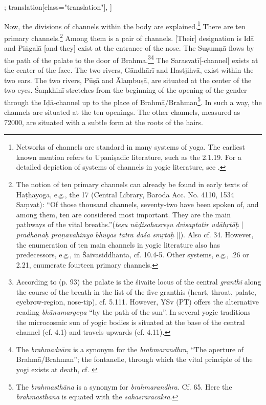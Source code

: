 \begin{alignment}[
  texts=edition[class="edition"];
  translation[class="translation"],
  ]
\begin{translation}
\begin{tlate}[p25_01]
 Now, the divisions of channels within the body are explained.\footnote{Networks of channels are standard in many systems of yoga. The earliest known mention refers to Upaniṣadic literature, such as the  2.1.19. For a detailed depiction of systems of channels in yogic literature, see \citeauthor[2017: 172-174, 184-198]{rootsofyoga2017}.} There are ten primary channels.\footnote{The notion of ten primary channels can already be found in early texts of Haṭhayoga, e.g., the  17 (Central Library, Baroda Acc. No. 4110, 1534 Saṃvat): ``Of those thousand channels, seventy-two have been spoken of, and among them, ten are considered most important. They are the main pathways of the vital breaths.''(\textit{teṣu nāḍisahasreṣu dvisaptatir udāhṛtāḥ} | \textit{pradhānāḥ prāṇavāhinyo bhūyas tatra daśa smṛtāḥ} ||). Also cf.  34. However, the enumeration of ten main channels in yogic literature also has predecessors, e.g., in Śaivasiddhānta, cf.  10.4-5. Other systems, e.g.,  .26 or  2.21, enumerate fourteen primary channels.} Among them is a pair of channels. [Their] designation is Idā and Piṅgalā [and they] exist at the entrance of the nose. The Suṣumṇā flows by the path of the palate to the door of Brahma.\footnote{According to  (p. 93) the palate is the śivaite locus of the central \textit{granthi} along the course of the breath in the list of the five granthis (heart, throat, palate, eyebrow-region, nose-tip), cf.  5.111. However, YSv (PT) offers the alternative reading \textit{bhānumargeṇa} ``by the path of the sun''. In several yogic traditions the microcosmic sun of yogic bodies is situated at the base of the central channel (cf.  4.1) and travels upwards (cf.  4.11).}\footnote{The \textit{brahmadvāra} is a synonym for the \textit{brahmarandhra}, ``The aperture of Brahmā/Brahman''; the fontanelle, through which the vital principle of the yogi exists at death, cf. \citeauthor[2017:438]{rootsofyoga2017}} The Sarasvatī[-channel] exists at the center of the face. The two rivers, Gāndhārī and Hastjihvā, exist within the two ears. The two rivers, Pūṣā and Ālaṃbuṣā, are situated at the center of the two eyes. Śaṃkhinī stretches from the beginning of the opening of the gender through the Iḍā-channel up to the place of Brahmā/Brahman\footnote{The \textit{brahmasthāna} is a synonym for \textit{brahmarandhra}. Cf.  65. Here the \textit{brahmasthāna} is equated with the \textit{sahasrāracakra}.}.  In such a way, the channels are situated at the ten openings. The other channels, measured as 72000, are situated with a subtle form at the roots of the hairs.

\end{tlate}
\end{translation}
\end{alignment}
